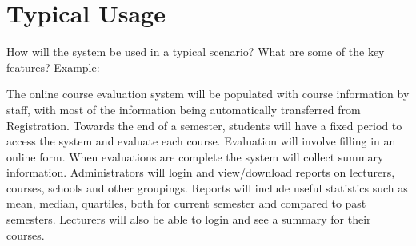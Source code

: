 \section{Typical Usage}
\label{sec:usage}
How will the system be used in a typical scenario? What are some of the key features? Example:

The online course evaluation system will be populated with course information by staff, with most of the information being automatically transferred from Registration. Towards the end of a semester, students will have a fixed period to access the system and evaluate each course. Evaluation will involve filling in an online form. When evaluations are complete the system will collect summary information. Administrators will login and view/download reports on lecturers, courses, schools and other groupings. Reports will include useful statistics such as mean, median, quartiles, both for current semester and compared to past semesters. Lecturers will also be able to login and see a summary for their courses.